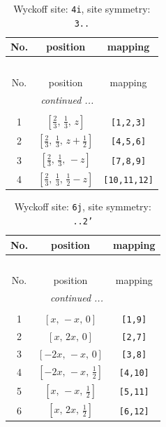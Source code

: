 \documentclass[fleqn,8pt]{jsarticle}
\begin{document}
\renewcommand{\arraystretch}{1.2}
\begin{longtable}{ccc}
\caption{Wyckoff site: {\tt 4i}, site symmetry: {\tt 3..}}
 \\
 \hline \hline
No. & position & mapping \\ \hline \endfirsthead

\multicolumn{2}{l}{\tablename\ \thetable{}} \\
 \hline \hline
No. & position & mapping \\ \hline \endhead

 \hline \hline
\multicolumn{2}{r}{\footnotesize\it continued ...} \\ \endfoot

 \hline \hline
\multicolumn{2}{r}{} \\ \endlastfoot

1 & $\left[ \frac{2}{3},\, \frac{1}{3},\, z \right]$ & {\tt [1,2,3]} \\ \hline
2 & $\left[ \frac{2}{3},\, \frac{1}{3},\, z + \frac{1}{2} \right]$ & {\tt [4,5,6]} \\ \hline
3 & $\left[ \frac{2}{3},\, \frac{1}{3},\, - z \right]$ & {\tt [7,8,9]} \\ \hline
4 & $\left[ \frac{2}{3},\, \frac{1}{3},\, \frac{1}{2} - z \right]$ & {\tt [10,11,12]} \\
\end{longtable}
\renewcommand{\arraystretch}{1.2}
\begin{longtable}{ccc}
\caption{Wyckoff site: {\tt 6j}, site symmetry: {\tt ..2'}}
 \\
 \hline \hline
No. & position & mapping \\ \hline \endfirsthead

\multicolumn{2}{l}{\tablename\ \thetable{}} \\
 \hline \hline
No. & position & mapping \\ \hline \endhead

 \hline \hline
\multicolumn{2}{r}{\footnotesize\it continued ...} \\ \endfoot

 \hline \hline
\multicolumn{2}{r}{} \\ \endlastfoot

1 & $\left[ x,\, - x,\, 0 \right]$ & {\tt [1,9]} \\ \hline
2 & $\left[ x,\, 2 x,\, 0 \right]$ & {\tt [2,7]} \\ \hline
3 & $\left[ - 2 x,\, - x,\, 0 \right]$ & {\tt [3,8]} \\ \hline
4 & $\left[ - 2 x,\, - x,\, \frac{1}{2} \right]$ & {\tt [4,10]} \\ \hline
5 & $\left[ x,\, - x,\, \frac{1}{2} \right]$ & {\tt [5,11]} \\ \hline
6 & $\left[ x,\, 2 x,\, \frac{1}{2} \right]$ & {\tt [6,12]} \\
\end{longtable}
\end{document}
